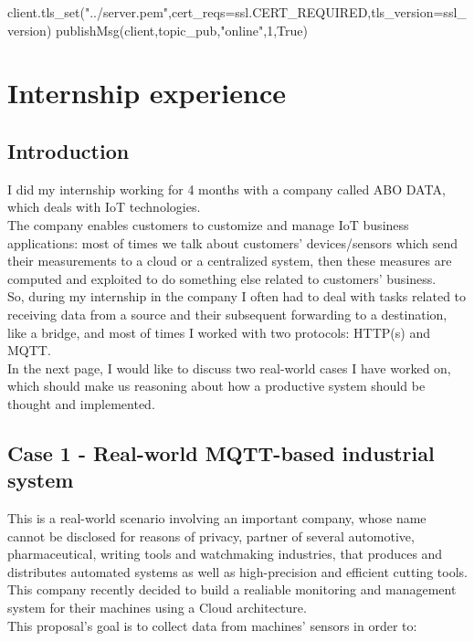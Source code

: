 \documentclass[12pt]{report}
\begin{document}
{\begin{python}
client.tls_set("../server.pem",cert_reqs=ssl.CERT_REQUIRED,tls_version=ssl_version)
publishMsg(client,topic_pub,"online",1,True)
\end{python}


\chapter{Internship experience}
\section{Introduction}
\bigskip
I did my internship working for 4 months with a company called ABO DATA, which deals with IoT technologies.\\
The company enables customers to customize and manage IoT business applications: most of times we talk about customers' devices/sensors which send their measurements to a cloud or a centralized system, then these measures are computed and exploited to do something else related to customers' business.\\
So, during my internship in the company I often had to deal with tasks related to receiving data from a source and their subsequent forwarding to a destination, like a bridge, and most of times I worked with two protocols: HTTP(s) and MQTT.\\

In the next page, I would like to discuss two real-world cases I have worked on, which should make us reasoning about how a productive system should be thought and implemented.\\

\clearpage
\section{Case 1 - Real-world MQTT-based industrial system}
\bigskip
This is a real-world scenario involving an important company, whose name cannot be disclosed for reasons of privacy, partner of several automotive, pharmaceutical, writing tools and watchmaking industries, that produces and distributes automated systems as well as high-precision and efficient cutting tools.\\

This company recently decided to build a realiable monitoring and management system for their machines using a Cloud architecture.\\
This proposal's goal is to collect data from machines' sensors in order to:

}
\end{document}
